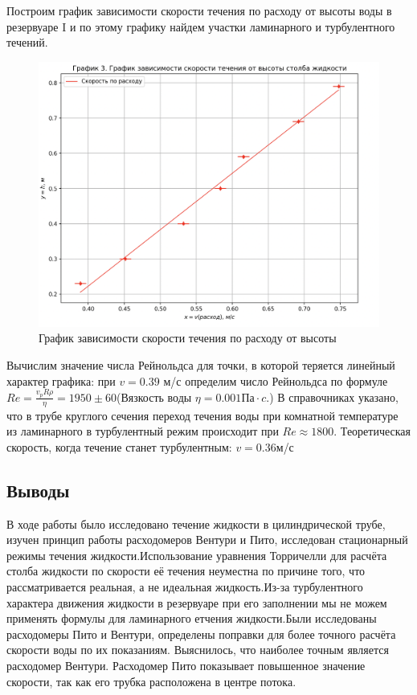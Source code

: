 \documentclass[a4paper,12pt]{article} %
\begin{document}
Построим график зависимости скорости течения по расходу от высоты воды в резервуаре I и по этому графику найдем участки ламинарного и турбулентного течений.

\newpage

\begin{figure}[h!]
	\begin{center}
		\includegraphics[width=18cm]{Snimok_Ekrana_2023-06-11_V_20_28_12.png}
	\end{center}
	\caption{График зависимости скорости течения по расходу от высоты}
	\label{ust}
\end{figure}

Вычислим значение числа Рейнольдса для точки, в которой теряется линейный характер графика: при $v = 0.39$ м/с определим число Рейнольдса по формуле $Re = \frac{v_pR\rho}{\eta} = 1950 \pm 60$(Вязкость воды $\eta = 0.001 Па \cdot c$.) В справочниках указано, что в трубе круглого сечения переход течения воды при комнатной температуре из ламинарного в турбулентный режим происходит при $Re \approx 1800$.
Теоретическая скорость, когда течение станет турбулентным: $v = 0.36$м/с


\subsection*{Выводы}
В ходе работы было исследовано течение жидкости в цилиндрической трубе, изучен принцип работы расходомеров Вентури и Пито, исследован стационарный режимы течения жидкости.Использование уравнения Торричелли для расчёта столба жидкости по скорости её течения неуместна по причине того, что рассматривается реальная, а не идеальная жидкость.Из-за турбулентного характера движения жидкости в резервуаре при его заполнении мы не можем применять формулы для ламинарного етчения жидкости.Были исследованы расходомеры Пито и Вентури, определены поправки для более точного расчёта скорости воды по их показаниям. Выяснилось, что наиболее точным является расходомер Вентури. Расходомер Пито показывает повышенное значение скорости, так как его трубка расположена в центре потока.
\end{document}
